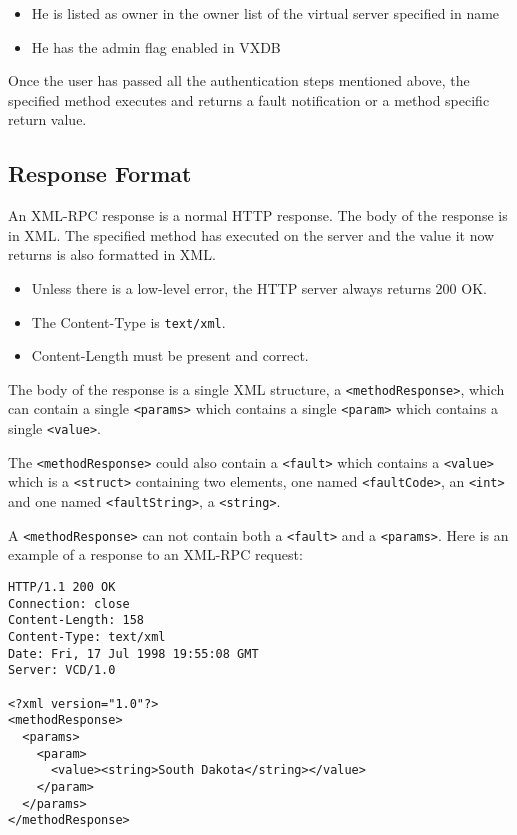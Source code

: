 \begin{itemize}
\item He is listed as owner in the owner list of the virtual server specified in name
\item He has the admin flag enabled in VXDB
\end{itemize}

Once the user has passed all the authentication steps mentioned above, the
specified method executes and returns a fault notification or a method specific
return value.


\subsection{Response Format}

An XML-RPC response is a normal HTTP response. The body of the response is in
XML. The specified method has executed on the server and the value it now
returns is also formatted in XML.

\begin{itemize}
\item Unless there is a low-level error, the HTTP server always returns 200 OK.
\item The Content-Type is \verb,text/xml,.
\item Content-Length must be present and correct.
\end{itemize}

The body of the response is a single XML structure, a \verb,<methodResponse>,,
which can contain a single \verb,<params>, which contains a single
\verb,<param>, which contains a single \verb,<value>,.

The \verb,<methodResponse>, could also contain a \verb,<fault>, which contains
a \verb,<value>, which is a \verb,<struct>, containing two elements, one named
\verb,<faultCode>,, an \verb,<int>, and one named \verb,<faultString>,, a
\verb,<string>,.

A \verb,<methodResponse>, can not contain both a \verb,<fault>, and a \verb,<params>,. Here is an
example of a response to an XML-RPC request:

\begin{verbatim}
HTTP/1.1 200 OK
Connection: close
Content-Length: 158
Content-Type: text/xml
Date: Fri, 17 Jul 1998 19:55:08 GMT
Server: VCD/1.0

<?xml version="1.0"?>
<methodResponse>
  <params>
    <param>
      <value><string>South Dakota</string></value>
    </param>
  </params>
</methodResponse>
\end{verbatim}

